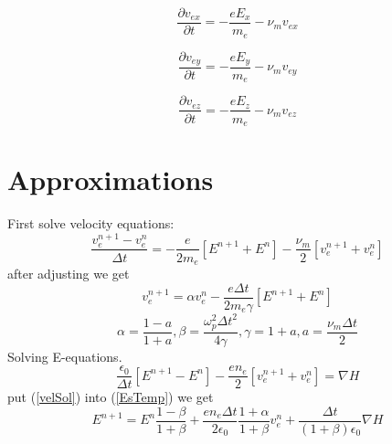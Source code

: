 \documentclass[a4paper,10pt]{article}
\begin{document}
\begin{equation}\label{eqVx}
\frac{\partial v_{ex}}{\partial t}=-\frac{e E_{x}}{m_{e}}-\nu_{m}v_{ex}
\end{equation}

\begin{equation}\label{eqVy}
\frac{\partial v_{ey}}{\partial t}=-\frac{e E_{y}}{m_{e}}-\nu_{m}v_{ey}
\end{equation}

\begin{equation}\label{eqVz}
\frac{\partial v_{ez}}{\partial t}=-\frac{e E_{z}}{m_{e}}-\nu_{m}v_{ez}
\end{equation}
\section{Approximations}
First solve velocity equations:
\begin{equation}
\frac{v_{e}^{n+1}-v_{e}^{n}}{\Delta t}=
-\frac{e}{2m_{e}}\left[E^{n+1}+E^{n}\right]
-\frac{\nu_{m}}{2}\left[v_{e}^{n+1}+v_{e}^{n}\right]
\end{equation}
after adjusting we get
\begin{equation}\label{velSol}
v_{e}^{n+1}=\alpha v_{e}^{n}-\frac{e\Delta t}{2m_{e}\gamma}\left[E^{n+1}+E^{n}\right]
\end{equation}
\begin{equation}\label{tempEqu}
\alpha=\frac{1-a}{1+a},\beta=\frac{\omega_{p}^{2}{\Delta t}^{2}}{4\gamma},\gamma=1+a,a=\frac{\nu_{m}\Delta t}{2}
\end{equation}
Solving E-equations.
\begin{equation}\label{EsTemp}
\frac{\epsilon_{0}}{\Delta t}\left[E^{n+1}-E^{n}\right]
-\frac{e n_{e}}{2}\left[v_{e}^{n+1}+v_{e}^{n}\right]=\nabla H
\end{equation}
put (\ref{velSol}) into (\ref{EsTemp}) we get
\begin{equation}
E^{n+1}=E^{n}\frac{1-\beta}{1+\beta}+\frac{e n_{e}\Delta t}{2\epsilon_{0}}\frac{1+\alpha}{1+\beta}v_{e}^{n}+\frac{\Delta t}{(1+\beta)\epsilon_{0}}\nabla H
\end{equation}
\end{document}
